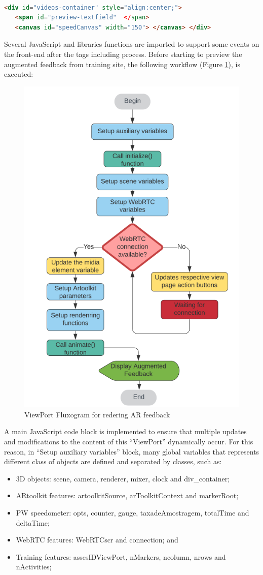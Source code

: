\begin{lstlisting}[frame=single,language=HTML]  % Start your code-block

<div id="videos-container" style="align:center;">
   <span id="preview-textfield"  </span>
   <canvas id="speedCanvas" width="150"> </canvas> </div>
\end{lstlisting}

Several JavaScript and libraries functions are imported to support some events on the front-end after the tags including process. Before starting to preview the augmented feedback from training site, the following workflow (Figure \ref{fig:ViewPortFluxogram}), is executed:

\begin{figure}[!hbt]
\begin{center}
\includegraphics[width=0.5\linewidth]{img/cap5/ViewPortFluxogram}
\caption{ViewPort Fluxogram for redering AR feedback} \label{fig:ViewPortFluxogram}
\end{center}
\vspace{-15pt}
\end{figure}

A main JavaScript code block is implemented to ensure that multiple updates and modifications to the content of this ``ViewPort'' dynamically occur. For this reason, in ``Setup auxiliary variables'' block, many global variables that represents different class of objects are defined and separated by classes, such as:
\begin{itemize}
\item 3D objects: scene, camera, renderer, mixer, clock and div\_container;
\item ARtoolkit features: artoolkitSource, arToolkitContext and markerRoot;
\item PW speedometer: opts, counter, gauge, taxadeAmostragem, totalTime and deltaTime; 
\item WebRTC features: WebRTCscr and connection; and
\item Training features: assesIDViewPort, nMarkers, ncolumn, nrows and nActivities;
\end{itemize} 

